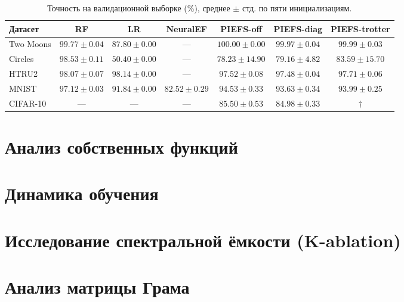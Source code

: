 \documentclass[14pt, a4paper, oneside]{extreport}
\theoremstyle{plain}
\theoremstyle{definition}
\begin{document}
\begin{table}[h]
  \centering
  \caption{Точность на валидационной выборке (\%), среднее $\pm$ стд. по пяти инициализациям.}
  \label{tab:main}
  \small
  \begin{tabular}{lcccccc}
    \toprule
    \textbf{Датасет} & \textbf{RF} & \textbf{LR} & \textbf{NeuralEF} & \textbf{PIEFS-off} & \textbf{PIEFS-diag} & \textbf{PIEFS-trotter} \\
    \midrule
    Two Moons  & $99.77{\pm}0.04$ & $87.80{\pm}0.00$ & --- & $\mathbf{100.00}{\pm}0.00$ & $99.97{\pm}0.04$ & $99.99{\pm}0.03$ \\
    Circles    & $98.53{\pm}0.11$ & $50.40{\pm}0.00$ & --- & $78.23{\pm}14.90$ & $79.16{\pm}4.82$ & $\mathbf{83.59}{\pm}15.70$ \\
    HTRU2      & $98.07{\pm}0.07$ & $98.14{\pm}0.00$ & --- & $97.52{\pm}0.08$ & $97.48{\pm}0.04$ & $\mathbf{97.71}{\pm}0.06$ \\
    \midrule
    MNIST      & $97.12{\pm}0.03$ & $91.84{\pm}0.00$ & $82.52{\pm}0.29$ & $\mathbf{94.53}{\pm}0.33$ & $93.63{\pm}0.34$ & $93.99{\pm}0.25$ \\
    CIFAR-10   & --- & --- & --- & $\mathbf{85.50}{\pm}0.53$ & $84.98{\pm}0.33$ & $\dagger$ \\
    \bottomrule
  \end{tabular}
\end{table}

\section{Анализ собственных функций}


\section{Динамика обучения}


\section{Исследование спектральной ёмкости (K-ablation)}


\section{Анализ матрицы Грама}
\end{document}
